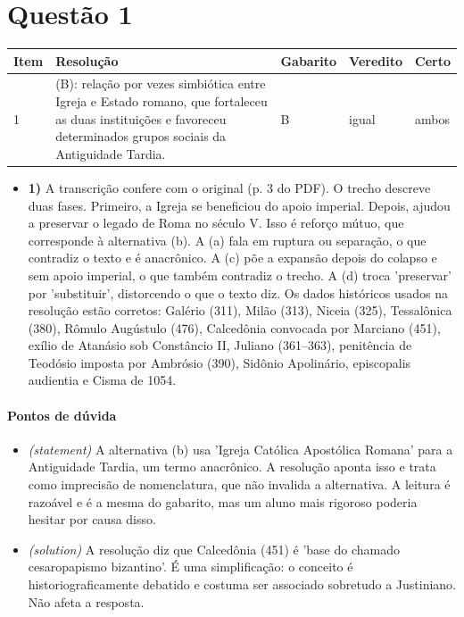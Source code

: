 \documentclass{article}%
\begin{document}
\section*{Questão 1}%
\begin{longtable}{@{}p{} p{} p{} p{} p{}@{}}\toprule Item & Resolução & Gabarito & Veredito & Certo \\ \midrule
1 & (B): relação por vezes simbiótica entre Igreja e Estado romano, que fortaleceu as duas instituições e favoreceu determinados grupos sociais da Antiguidade Tardia. & B & igual & ambos \\
\bottomrule\end{longtable}%
\begin{itemize}%
\item%
\textbf{1)} A transcrição confere com o original (p. 3 do PDF). O trecho descreve duas fases. Primeiro, a Igreja se beneficiou do apoio imperial. Depois, ajudou a preservar o legado de Roma no século V. Isso é reforço mútuo, que corresponde à alternativa (b). A (a) fala em ruptura ou separação, o que contradiz o texto e é anacrônico. A (c) põe a expansão depois do colapso e sem apoio imperial, o que também contradiz o trecho. A (d) troca 'preservar' por 'substituir', distorcendo o que o texto diz. Os dados históricos usados na resolução estão corretos: Galério (311), Milão (313), Niceia (325), Tessalônica (380), Rômulo Augústulo (476), Calcedônia convocada por Marciano (451), exílio de Atanásio sob Constâncio II, Juliano (361--363), penitência de Teodósio imposta por Ambrósio (390), Sidônio Apolinário, episcopalis audientia e Cisma de 1054.%
\end{itemize}%
\paragraph{Pontos de dúvida}%
\begin{itemize}%
\item%
\textit{(statement)} A alternativa (b) usa 'Igreja Católica Apostólica Romana' para a Antiguidade Tardia, um termo anacrônico. A resolução aponta isso e trata como imprecisão de nomenclatura, que não invalida a alternativa. A leitura é razoável e é a mesma do gabarito, mas um aluno mais rigoroso poderia hesitar por causa disso.%
\item%
\textit{(solution)} A resolução diz que Calcedônia (451) é 'base do chamado cesaropapismo bizantino'. É uma simplificação: o conceito é historiograficamente debatido e costuma ser associado sobretudo a Justiniano. Não afeta a resposta.%
\end{itemize}%
\end{document}
